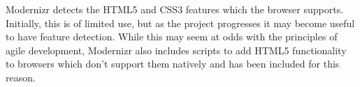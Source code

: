 Modernizr detects the HTML5 and CSS3 features which the browser supports. Initially, this is of limited use, but as the project progresses it may become useful to have feature detection. While this may seem at odds with the principles of agile development, Modernizr also includes scripts to add HTML5 functionality to browsers which don't support them natively and has been included for this reason.




